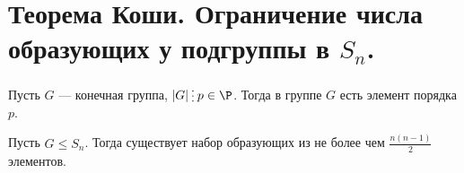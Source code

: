 % 
% 
\section{Теорема Коши. Ограничение числа образующих у подгруппы в $ S_{n} $.}
\begin{thm}[Коши]
    Пусть $ G$ --- конечная группа,  $ \lvert G \rvert \del p \in \P$. Тогда в группе $ G$ есть элемент порядка  $ p$.
\end{thm}
\begin{thm}
    Пусть $ G \le S_{n} $. Тогда существует набор образующих из не более чем $ \frac{n(n-1)}{2}$ элементов.
\end{thm}
% 
